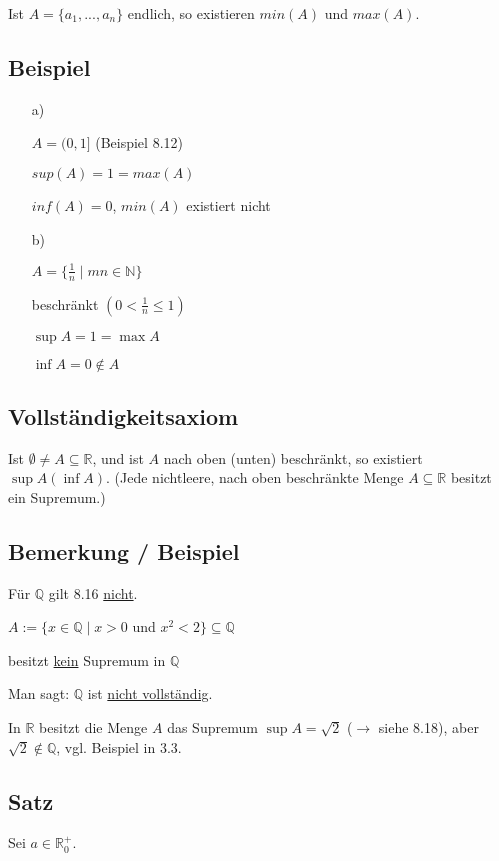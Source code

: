 \documentclass[a4paper, 12pt, twoside] {article}
\begin{document}
Ist $A = \{a_1,...,a_n\}$ endlich, so existieren $min(A)$ und $max(A)$.

\subsection{Beispiel} %

\begin{itemize}
\item[a)]

$A = (0,1]$ (Beispiel 8.12)

$sup(A) = 1 = max(A)$

$inf(A) = 0$, $min(A)$ existiert nicht


\item[b)]

$A = \{\frac{1}{n} \mid mn \in \mathbb{N}\}$

beschränkt $(0 < \frac{1}{n} \leq 1)$

$\sup A = 1 = \max A$

$\inf A = 0 \notin A$

\end{itemize}

\subsection{Vollständigkeitsaxiom} %
Ist $\emptyset \neq A \subseteq \mathbb{R}$, und ist $A$ nach oben (unten) beschränkt,
so existiert $\sup A (\inf A)$.
(Jede nichtleere, nach oben beschränkte Menge $A \subseteq \mathbb{R}$ besitzt ein Supremum.)

\subsection{Bemerkung / Beispiel} %
Für $\mathbb{Q}$ gilt 8.16 \underline{nicht}.

$A := \{x \in \mathbb{Q} \mid x > 0$ und $x^2 < 2\} \subseteq \mathbb{Q}$

besitzt \underline{kein} Supremum in $\mathbb{Q}$

Man sagt: $\mathbb{Q}$ ist \underline{nicht vollständig}.

In $\mathbb{R}$ besitzt die Menge $A$ das Supremum $\sup A = \sqrt{2}$ ($\rightarrow$ siehe 8.18),
aber $\sqrt{2} \notin \mathbb{Q}$, vgl. Beispiel in 3.3.

\subsection{Satz} %
Sei $a \in \mathbb{R}_{0}^{+}$.
\end{document}
